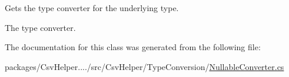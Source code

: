 Gets the type converter for the underlying type. 

The type converter. 

The documentation for this class was generated from the following file\-:\begin{DoxyCompactItemize}
\item 
packages/\-Csv\-Helper..../src/\-Csv\-Helper/\-Type\-Conversion/\hyperlink{a00236}{Nullable\-Converter.\-cs}\end{DoxyCompactItemize}
